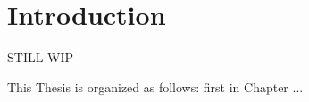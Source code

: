 \chapter{Introduction}
\label{introduction}
STILL WIP

This Thesis is organized as follows: first in Chapter ...
